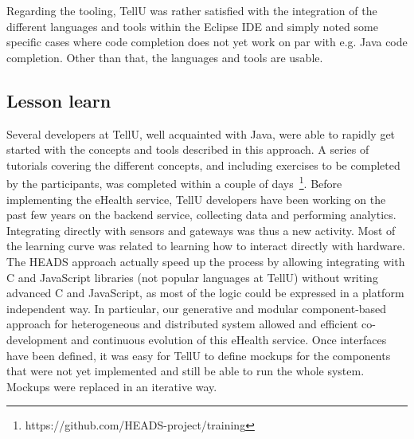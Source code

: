 Regarding the tooling, TellU was rather satisfied with the integration of the different languages and tools within the Eclipse IDE and simply noted some specific cases where code completion does not yet work on par with e.g. Java code completion. Other than that, the languages and tools are usable.

\subsection{Lesson learn}
Several developers at TellU, well acquainted with Java, were able to rapidly get started with the concepts and tools described in this approach. A series of tutorials covering the different concepts, and including exercises to be completed by the participants, was completed within a couple of days~\footnote{https://github.com/HEADS-project/training}. Before implementing the eHealth service, TellU developers have been working on the past few years on the backend service, collecting data and performing analytics. Integrating directly with sensors and gateways was thus a new activity. Most of the learning curve was related to learning how to interact directly with hardware. The HEADS approach actually speed up the process by allowing integrating with C and JavaScript libraries (not popular languages at TellU) without writing advanced C and JavaScript, as most of the logic could be expressed in a platform independent way. In particular, our generative and modular component-based approach for heterogeneous and distributed system allowed and efficient co-development and continuous evolution of this eHealth service. Once interfaces have been defined, it was easy for TellU to define mockups for the components that were not yet implemented and still be able to run the whole system. Mockups were replaced in an iterative way.
